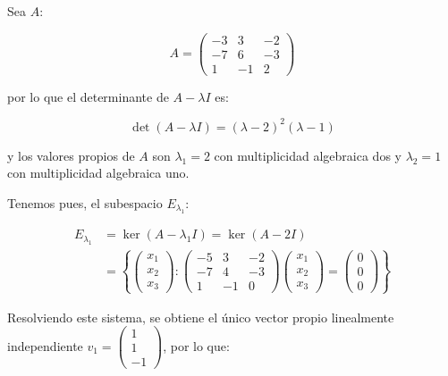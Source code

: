 		\begin{ejemplo}
			Sea $A$:

			\begin{equation*}
				A =
				\begin{pmatrix}
					-3 & 3 & -2 \\
					-7 & 6 & -3 \\
					1 & -1 & 2
				\end{pmatrix}
			\end{equation*}

			por lo que el determinante de $A - \lambda I$ es:

			\begin{equation*}
				\det{(A - \lambda I)} = (\lambda - 2)^2 (\lambda - 1)
			\end{equation*}

			y los valores propios de $A$ son $\lambda_1 = 2$ con multiplicidad algebraica dos y $\lambda_2 = 1$ con multiplicidad algebraica uno.

			Tenemos pues, el subespacio $E_{\lambda_1}$:

			\begin{align*}
				E_{\lambda_1} &= \ker{(A - \lambda_1 I)} = \ker{(A - 2I)} \\
				&= \left\{ \begin{pmatrix} x_1 \\ x_2 \\ x_3 \end{pmatrix} \colon \begin{pmatrix} -5 & 3 & -2 \\ -7 & 4 & -3 \\ 1 & -1 & 0 \end{pmatrix} \begin{pmatrix} x_1 \\ x_2 \\ x_3 \end{pmatrix} = \begin{pmatrix} 0 \\ 0 \\ 0 \end{pmatrix} \right\}
			\end{align*}

			Resolviendo este sistema, se obtiene el único vector propio linealmente independiente $v_1 = \begin{pmatrix} 1 \\ 1 \\ -1 \end{pmatrix}$, por lo que:


\end{ejemplo}
